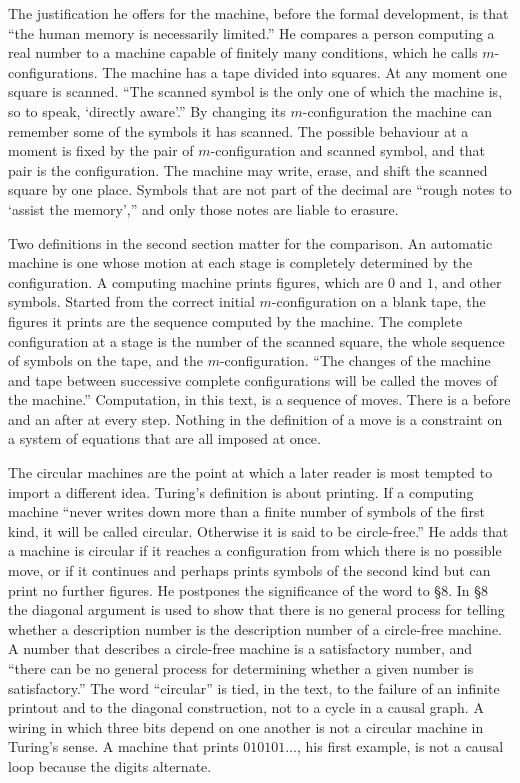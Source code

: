\documentclass[12pt]{article}
\begin{document}
The justification he offers for the machine, before the formal development, is that ``the human memory is necessarily limited.'' He compares a person computing a real number to a machine capable of finitely many conditions, which he calls $m$-configurations. The machine has a tape divided into squares. At any moment one square is scanned. ``The scanned symbol is the only one of which the machine is, so to speak, `directly aware'.'' By changing its $m$-configuration the machine can remember some of the symbols it has scanned. The possible behaviour at a moment is fixed by the pair of $m$-configuration and scanned symbol, and that pair is the configuration. The machine may write, erase, and shift the scanned square by one place. Symbols that are not part of the decimal are ``rough notes to `assist the memory','' and only those notes are liable to erasure.

Two definitions in the second section matter for the comparison. An automatic machine is one whose motion at each stage is completely determined by the configuration. A computing machine prints figures, which are $0$ and $1$, and other symbols. Started from the correct initial $m$-configuration on a blank tape, the figures it prints are the sequence computed by the machine. The complete configuration at a stage is the number of the scanned square, the whole sequence of symbols on the tape, and the $m$-configuration. ``The changes of the machine and tape between successive complete configurations will be called the moves of the machine.'' Computation, in this text, is a sequence of moves. There is a before and an after at every step. Nothing in the definition of a move is a constraint on a system of equations that are all imposed at once.

The circular machines are the point at which a later reader is most tempted to import a different idea. Turing's definition is about printing. If a computing machine ``never writes down more than a finite number of symbols of the first kind, it will be called circular. Otherwise it is said to be circle-free.'' He adds that a machine is circular if it reaches a configuration from which there is no possible move, or if it continues and perhaps prints symbols of the second kind but can print no further figures. He postpones the significance of the word to \S 8. In \S 8 the diagonal argument is used to show that there is no general process for telling whether a description number is the description number of a circle-free machine. A number that describes a circle-free machine is a satisfactory number, and ``there can be no general process for determining whether a given number is satisfactory.'' The word ``circular'' is tied, in the text, to the failure of an infinite printout and to the diagonal construction, not to a cycle in a causal graph. A wiring in which three bits depend on one another is not a circular machine in Turing's sense. A machine that prints $010101\ldots$, his first example, is not a causal loop because the digits alternate.
\end{document}
